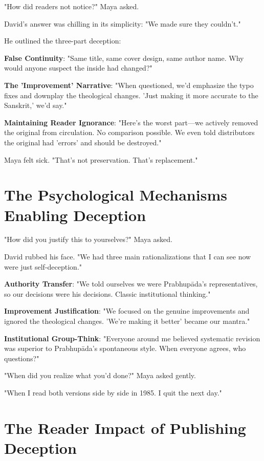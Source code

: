 \documentclass[11pt,twoside]{book}
\begin{document}
"How did readers not notice?" Maya asked.

David's answer was chilling in its simplicity: "We made sure they couldn't."

He outlined the three-part deception:

\textbf{\textbf{False Continuity}}: "Same title, same cover design, same author name. Why would anyone suspect the inside had changed?"

\textbf{\textbf{The 'Improvement' Narrative}}: "When questioned, we'd emphasize the typo fixes and downplay the theological changes. 'Just making it more accurate to the Sanskrit,' we'd say."

\textbf{\textbf{Maintaining Reader Ignorance}}: "Here's the worst part—we actively removed the original from circulation. No comparison possible. We even told distributors the original had 'errors' and should be destroyed."

Maya felt sick. "That's not preservation. That's replacement."
\section*{The Psychological Mechanisms Enabling Deception}
\label{sec:org1510afd}

"How did you justify this to yourselves?" Maya asked.

David rubbed his face. "We had three main rationalizations that I can see now were just self-deception."

\textbf{\textbf{Authority Transfer}}: "We told ourselves we were Prabhupāda's representatives, so our decisions were his decisions. Classic institutional thinking."

\textbf{\textbf{Improvement Justification}}: "We focused on the genuine improvements and ignored the theological changes. 'We're making it better' became our mantra."

\textbf{\textbf{Institutional Group-Think}}: "Everyone around me believed systematic revision was superior to Prabhupāda's spontaneous style. When everyone agrees, who questions?"

"When did you realize what you'd done?" Maya asked gently.

"When I read both versions side by side in 1985. I quit the next day."
\section*{The Reader Impact of Publishing Deception}
\label{sec:org9f53c34}
\end{document}
